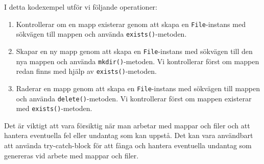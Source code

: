 \begin{Shaded}
\begin{Highlighting}[]
        \OperatorTok{=} \SpecialCharTok{\textbackslash{}\textbackslash{}}\SpecialCharTok{\textbackslash{}\textbackslash{}}\OperatorTok{;}
        \OperatorTok{=}  \OperatorTok{(}\OperatorTok{);}
         \OperatorTok{(}\OperatorTok{())} \OperatorTok{\{}
             \OperatorTok{(}\OperatorTok{())} \OperatorTok{\{}
                \OperatorTok{(}\OperatorTok{);}
            \OperatorTok{\}}  \OperatorTok{\{}
                \OperatorTok{(}\OperatorTok{);}
            \OperatorTok{\}}
        \OperatorTok{\}}
    \OperatorTok{\}}
\OperatorTok{\}}
\end{Highlighting}
\end{Shaded}

I detta kodexempel utför vi följande operationer:

\begin{enumerate}
\def\labelenumi{\arabic{enumi}.}
\tightlist
\item
  Kontrollerar om en mapp existerar genom att skapa en
  \texttt{File}-instans med sökvägen till mappen och använda
  \texttt{exists()}-metoden.
\item
  Skapar en ny mapp genom att skapa en \texttt{File}-instans med
  sökvägen till den nya mappen och använda \texttt{mkdir()}-metoden. Vi
  kontrollerar först om mappen redan finns med hjälp av
  \texttt{exists()}-metoden.
\item
  Raderar en mapp genom att skapa en \texttt{File}-instans med sökvägen
  till mappen och använda \texttt{delete()}-metoden. Vi kontrollerar
  först om mappen existerar med \texttt{exists()}-metoden.
\end{enumerate}

Det är viktigt att vara försiktig när man arbetar med mappar och filer
och att hantera eventuella fel eller undantag som kan uppstå. Det kan
vara användbart att använda try-catch-block för att fånga och hantera
eventuella undantag som genereras vid arbete med mappar och filer.

